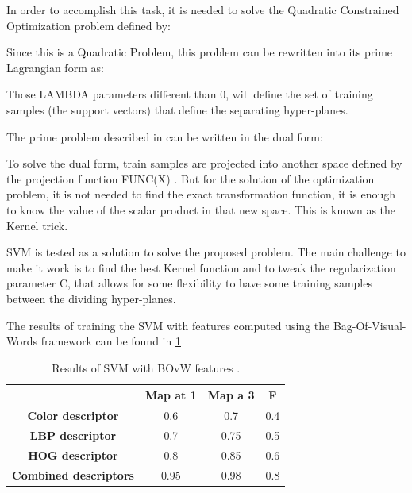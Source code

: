 \documentclass[runningheads]{llncs}
\begin{document}
In order to accomplish this task, it is needed to solve the Quadratic Constrained Optimization problem defined by: 

Since this is a Quadratic Problem, this problem can be rewritten into its prime Lagrangian form as:

Those LAMBDA parameters  different than 0, will define the set of training samples (the support vectors) that define the separating hyper-planes.

The prime problem described in  can be written in the dual form:

To solve the dual form, train samples are projected into another space defined by the projection function FUNC(X) . But for the solution of the optimization problem, it is not needed to find the exact transformation function, it is enough to know the value of the scalar product in that new space. This is known as the Kernel trick. 

SVM is tested as a solution to solve the proposed problem. The main challenge to make it work is to find the best Kernel function and to tweak the regularization parameter C, that allows for some flexibility to have some training samples between the dividing hyper-planes.

The results of training the SVM with features computed using the Bag-Of-Visual-Words framework can be found in \ref{SVMResults}

\begin{table}[ht!]
\caption{Results of SVM with BOvW features .}
\begin{center}
\begin{tabular}{ | c | c | c | c | }
\hline
 & \textbf{Map at 1} & \textbf{Map a 3} & \textbf{F} \\ 
 \hline
 \textbf{Color descriptor} & 0.6 & 0.7 & 0.4 \\  
 \hline
 \textbf{LBP descriptor} & 0.7 & 0.75 & 0.5 \\ 
 \hline
 \textbf{HOG descriptor} & 0.8 & 0.85 & 0.6 \\  
 \hline
 \textbf{Combined descriptors} & 0.95 & 0.98 & 0.8 \\  
 \hline
\end{tabular}
\label{SVMResults}
\end{center}
\end{table}
\end{document}
